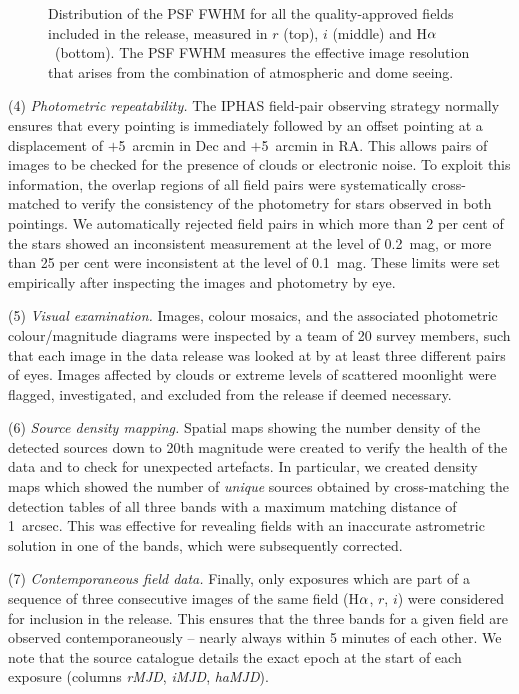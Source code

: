 \documentclass[a4paper,useAMS,usenatbib]{mn2e}
\def\ha{\mbox{H$\rm \alpha$}}
\begin{document}
\begin{figure}
\begin{minipage}[b]{\linewidth}
    \end{minipage}
    \caption{Distribution of the PSF FWHM
             for all the quality-approved fields
             included in the release,
             measured in $r$ (top), $i$ (middle) and \ha\ (bottom).
             The PSF FWHM measures the effective image resolution
             that arises from the combination of atmospheric and dome seeing.}
    \label{fig:seeing}
\end{figure}


(4) \emph{Photometric repeatability.} 
The IPHAS field-pair observing strategy normally
ensures that every pointing is immediately followed 
by an offset pointing at a displacement
of $+$5~arcmin in Dec and $+$5~arcmin in RA.
This allows pairs of images to be checked 
for the presence of clouds or electronic noise.
To exploit this information,
the overlap regions of all field pairs were systematically cross-matched
to verify the consistency of the photometry
for stars observed in both pointings.
We automatically rejected field pairs
in which more than 2 per cent of the stars 
showed an inconsistent measurement at the level of 0.2~mag,
or more than 25 per cent were inconsistent at the level of 0.1~mag.
These limits were set empirically after inspecting
the images and photometry by eye.

(5) \emph{Visual examination.}
Images, colour mosaics,
and the associated photometric colour/magnitude diagrams
were inspected by a team of 20 survey members, 
such that each image in the data release 
was looked at by at least three different pairs of eyes.
Images affected by clouds or extreme levels of scattered moonlight
were flagged, investigated,
and excluded from the release 
if deemed necessary.

(6) \emph{Source density mapping.}
Spatial maps showing the number density of the detected sources
down to 20th magnitude were created to verify the health
of the data and to check for unexpected artefacts.
In particular, we created density maps
which showed the number of \emph{unique} sources
obtained by cross-matching the detection tables of
all three bands with a maximum matching distance of 1~arcsec.
This was effective for revealing
fields with an inaccurate astrometric solution in one of the bands,
which were subsequently corrected.

(7) \emph{Contemporaneous field data.} 
Finally, only exposures which are part of a sequence 
of three consecutive images of the same field
(\ha, $r$, $i$)
were considered for inclusion in the release. 
This ensures that the three bands for a given field
are observed contemporaneously --  
nearly always within 5 minutes of each other.
We note that the source catalogue details the exact epoch
at the start of each exposure
(columns \emph{rMJD}, \emph{iMJD}, \emph{haMJD}).
\end{document}

